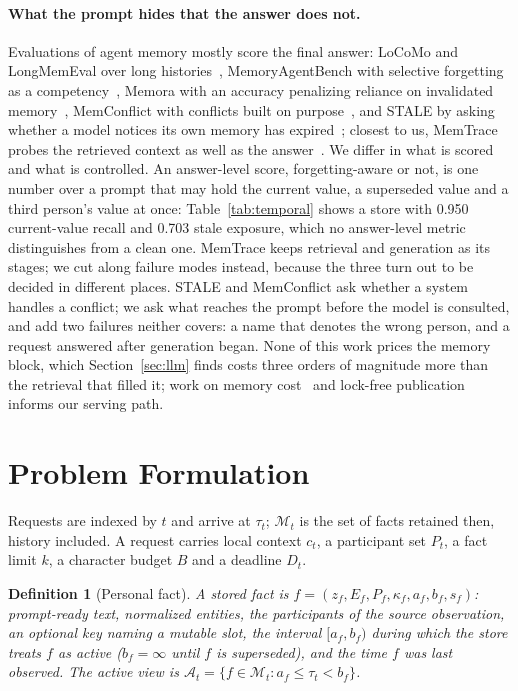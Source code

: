 \documentclass{article} %
\newtheorem{definition}{Definition}
\begin{document}
\paragraph{What the prompt hides that the answer does not.} Evaluations of agent memory mostly score the final answer: LoCoMo and LongMemEval over long histories~\citep{maharana2024evaluating,wu2024longmemeval}, MemoryAgentBench with selective forgetting as a competency~\citep{hu2026memoryagentbench}, Memora with an accuracy penalizing reliance on invalidated memory~\citep{uddin2026memora}, MemConflict with conflicts built on purpose~\citep{tao2026memconflict}, and STALE by asking whether a model notices its own memory has expired~\citep{chao2026stale}; closest to us, MemTrace probes the retrieved context as well as the answer~\citep{long2026memtrace}. We differ in what is scored and what is controlled. An answer-level score, forgetting-aware or not, is one number over a prompt that may hold the current value, a superseded value and a third person's value at once: Table~\ref{tab:temporal} shows a store with 0.950 current-value recall and 0.703 stale exposure, which no answer-level metric distinguishes from a clean one. MemTrace keeps retrieval and generation as its stages; we cut along failure modes instead, because the three turn out to be decided in different places. STALE and MemConflict ask whether a system handles a conflict; we ask what reaches the prompt before the model is consulted, and add two failures neither covers: a name that denotes the wrong person, and a request answered after generation began. None of this work prices the memory block, which Section~\ref{sec:llm} finds costs three orders of magnitude more than the retrieval that filled it; work on memory cost~\citep{zhao2025ame,yuan2026agentir,zhou2026we} and lock-free publication~\citep{mckenney1998rcu,mccandless2010lucene} informs our serving path.

\section{Problem Formulation}
\label{sec:problem}

Requests are indexed by $t$ and arrive at $\tau_t$; $\mathcal{M}_t$ is the set of facts retained then, history included. A request carries local context $c_t$, a participant set $P_t$, a fact limit $k$, a character budget $B$ and a deadline $D_t$.

\begin{definition}[Personal fact]
A stored fact is $f=(z_f,E_f,P_f,\kappa_f,a_f,b_f,s_f)$: prompt-ready text, normalized entities, the participants of the source observation, an optional key naming a mutable slot, the interval $[a_f,b_f)$ during which the store treats $f$ as active ($b_f=\infty$ until $f$ is superseded), and the time $f$ was last observed. The active view is $\mathcal{A}_t=\{f\in\mathcal{M}_t:a_f\le\tau_t<b_f\}$.
\end{definition}
\end{document}
